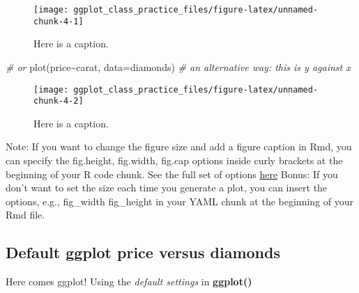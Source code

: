 \documentclass[
]{article}
\newenvironment{Shaded}{\begin{snugshade}}{\end{snugshade}}
\newcommand{\AttributeTok}[1]{\textcolor[rgb]{0.77,0.63,0.00}{#1}}
\newcommand{\CommentTok}[1]{\textcolor[rgb]{0.56,0.35,0.01}{\textit{#1}}}
\newcommand{\DocumentationTok}[1]{\textcolor[rgb]{0.56,0.35,0.01}{\textbf{\textit{#1}}}}
\newcommand{\FunctionTok}[1]{\textcolor[rgb]{0.00,0.00,0.00}{#1}}
\newcommand{\NormalTok}[1]{#1}
\newcommand{\SpecialCharTok}[1]{\textcolor[rgb]{0.00,0.00,0.00}{#1}}
\newcommand{\StringTok}[1]{\textcolor[rgb]{0.31,0.60,0.02}{#1}}
\begin{document}
\begin{figure}

{\centering \texttt{[image: ggplot\_class\_practice\_files/figure-latex/unnamed-chunk-4-1]} 

}

\caption{Here is a caption.}\label{fig:unnamed-chunk-4-1}
\end{figure}

\begin{Shaded}
\begin{Highlighting}[]
\CommentTok{\# or}
\FunctionTok{plot}\NormalTok{(price}\SpecialCharTok{\textasciitilde{}}\NormalTok{carat, }\AttributeTok{data=}\NormalTok{diamonds) }\CommentTok{\# an alternative way: this is y against x}
\end{Highlighting}
\end{Shaded}

\begin{figure}

{\centering \texttt{[image: ggplot\_class\_practice\_files/figure-latex/unnamed-chunk-4-2]} 

}

\caption{Here is a caption.}\label{fig:unnamed-chunk-4-2}
\end{figure}

Note: If you want to change the figure size and add a figure caption in
Rmd, you can specify the fig.height, fig.width, fig.cap options inside
curly brackets at the beginning of your R code chunk. See the full set
of options \href{https://rpubs.com/Lingling912/870659}{here} Bonus: If
you don't want to set the size each time you generate a plot, you can
insert the options, e.g., fig\_width fig\_height in your YAML chunk at
the beginning of your Rmd file.

\hypertarget{default-ggplot-price-versus-diamonds}{%
\subsection{Default ggplot price versus
diamonds}\label{default-ggplot-price-versus-diamonds}}

Here comes ggplot! Using the \emph{default settings} in
\textbf{ggplot()}

\begin{Shaded}
\end{Shaded}
\end{document}
